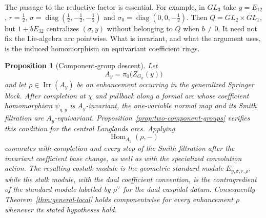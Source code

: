 \documentclass[11pt]{amsart}
\newtheorem{proposition}[theorem]{Proposition}
\theoremstyle{definition}
\theoremstyle{remark}
\begin{document}
The passage to the reductive factor is essential.  For example, in
$GL_3$ take $y=E_{12}$, $r=\tfrac12$,
$\sigma=\operatorname{diag}(\tfrac12,-\tfrac12,-\tfrac12)$ and
$\sigma_0=\operatorname{diag}(0,0,-\tfrac12)$.  Then
$Q=GL_2\times GL_1$, but $1+bE_{32}$ centralizes $(\sigma,y)$
without belonging to $Q$ when $b\ne0$.  It need not fix the
Lie-algebra arc pointwise.  What is invariant, and what the argument
uses, is the induced homomorphism on equivariant coefficient rings.

\begin{proposition}[Component-group descent]
\label{prop:component-descent}
Let
\[
 A_y=\pi_0\bigl(Z_{G_\sigma}(y)\bigr)
\]
and let $\rho\in\operatorname{Irr}(A_y)$ be an enhancement occurring in the
generalized Springer block.  After completion at $\chi$ and pullback along a
formal arc whose coefficient homomorphism $\psi_{\eta,y}$ is
$A_y$-invariant, the
one-variable normal map and its Smith filtration are $A_y$-equivariant.
Proposition~\ref{prop:two-component-groups} verifies this condition for
the central Langlands arcs.  Applying
\[
 \operatorname{Hom}_{A_y}(\rho,-)
\]
commutes with completion and every step of the Smith filtration
after the invariant coefficient base change, as well as with the
specialized convolution action.  The resulting costalk module is the
geometric standard module $E_{y,\sigma,r,\rho}$, while the stalk module, with
the dual coefficient convention, is the contragredient of the standard
module labelled by $\rho^\vee$ for the dual cuspidal datum.  Consequently
Theorem~\ref{thm:general-local} holds componentwise for every enhancement
$\rho$ whenever its stated hypotheses hold.
\end{proposition}
\end{document}
